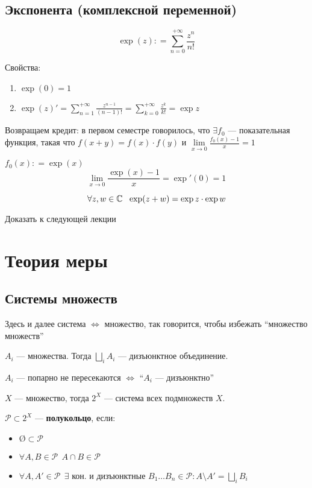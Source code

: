 \subsection*{Экспонента (комплексной переменной)}

\begin{definition}
    \[\exp(z) : = \sum_{n = 0}^{ +\infty} \frac{z^n}{n!} \]
\end{definition}

Свойства:
\begin{enumerate}
    \item \(\exp(0) = 1\)
    \item \(\exp(z)' = \sum\limits_{n = 1}^{ +\infty} \frac{z^{n - 1}}{(n - 1)!} = \sum\limits_{k = 0}^{ +\infty} \frac{z^{k}}{k!} = \exp z\)
\end{enumerate}

Возвращаем кредит: в первом семестре говорилось, что \(\exists f_0\) --- показательная функция, такая что \(f(x + y) = f(x)\cdot f(y)\) и \(\lim\limits_{x\to 0} \frac{f_0(x) - 1}{x} = 1\)

\(f_0(x) : = \exp(x)\)
\[\lim_{x\to 0} \frac{\exp(x) - 1}{x} = \exp'(0) = 1\]

\begin{theorem}
    \[\forall z, w\in \mathbb{C} \ \ \exp(z + w) = \exp z \cdot \exp w\]
\end{theorem}
\begin{exercise}
    Доказать к следующей лекции
\end{exercise}

\section*{Теория меры}

\subsection*{Системы множеств}

Здесь и далее система \(\iff \) множество, так говорится, чтобы избежать ``множество множеств''

\begin{obozn}
    \(A_i\) --- множества. Тогда \(\bigsqcup\limits_i A_i\) --- дизъюнктное объединение.

    \(A_i\) --- попарно не пересекаются \( \iff \) ``\(A_i\) --- дизъюнктно''
\end{obozn}

\begin{definition}
    \(X\) --- множество, тогда \(2^X\) --- система всех подмножеств \(X\).

    \(\mathcal P \subset 2^X\) --- \textbf{полукольцо}, если:
    \begin{itemize}
        \item \(\text{\O}\subset \mathcal P\)
        \item \(\forall A,B \in \mathcal P \ \ A\cap B\in \mathcal{P}\)
        \item \(\forall A, A' \in \mathcal{P} \ \ \exists \text{ кон. и дизъюнктные } B_1\dots B_n\in \mathcal{P} : A\setminus A' = \bigsqcup\limits_i B_i\)
    \end{itemize}
\end{definition}

